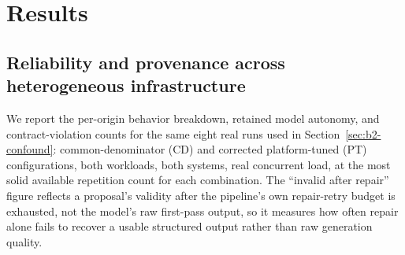 \section{Results}
\label{sec:results}

\subsection{Reliability and provenance across heterogeneous infrastructure}
\label{sec:reliability-results}

We report the per-origin behavior breakdown, retained model autonomy, and contract-violation counts for the same eight real runs used in Section~\ref{sec:b2-confound}: common-denominator (CD) and corrected platform-tuned (PT) configurations, both workloads, both systems, real concurrent load, at the most solid available repetition count for each combination. The ``invalid after repair'' figure reflects a proposal's validity after the pipeline's own repair-retry budget is exhausted, not the model's raw first-pass output, so it measures how often repair alone fails to recover a usable structured output rather than raw generation quality.

